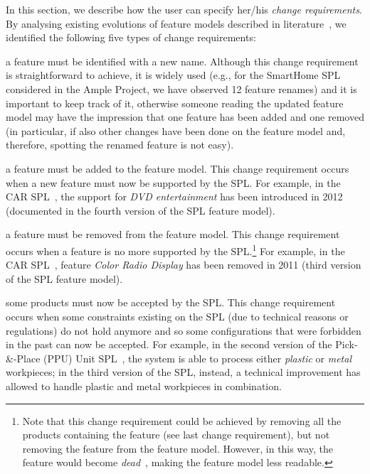 \begin{tikzborder}{\cite{Gargantini16:validation}}
\begin{tikzborder}{\cite{gargantini_combinatorial_2017}}
\begin{tikzborder}{\cite{gargantini_combinatorial_2017}}
\begin{tikzborder}{\cite{garn2019}}
\begin{tikzborder}{\cite{arcaini2019achieving}}
	In this section, we describe how the user can specify her/his {\it change requirements}.
	By analysing existing evolutions of feature models described in literature~\cite{Pleuss2012,Burdek2016,smartHomePaper,helpSystemPaper,multimediaPaper}, we identified the following five types of change requirements: 
	\begin{compactitem}
		\item a feature must be identified with a new name. Although this change requirement is straightforward to achieve, it is widely used (e.g., for the Smart\-Home SPL~\cite{smartHomePaper} considered in the Ample Project, we have observed 12 feature renames) and it is important to keep track of it, otherwise someone reading the updated feature model may have the impression that one feature has been added and one removed (in particular, if also other changes have been done on the feature model and, therefore, spotting the renamed feature is not easy).
		\item a feature must be added to the feature model. This change requirement occurs when a new feature must now be supported by the SPL. For example, in the CAR SPL~\cite{Pleuss2012}, the support for {\it DVD entertainment} has been introduced in 2012 (documented in the fourth version of the SPL feature model).
		\item a feature must be removed from the feature model. This change requirement occurs when a feature is no more supported by the SPL.\footnote{Note that this change requirement could be achieved by removing all the products containing the feature (see last change requirement), but not removing the feature from the feature model. However, in this way, the feature would become {\it dead}~\cite{benavides2010automated}, making the feature model less readable.} For example, in the CAR SPL~\cite{Pleuss2012}, feature {\it Color Radio Display} has been removed in 2011 (third version of the SPL feature model).
		\item some products must now be accepted by the SPL. This change requirement occurs when some constraints existing on the SPL (due to technical reasons or regulations) do not hold anymore and so some configurations that were forbidden in the past can now be accepted. For example, in the second version of the Pick-\&-Place (PPU) Unit SPL~\cite{Burdek2016}, the system is able to process either {\it plastic} or {\it metal} workpieces; in the third version of the SPL, instead, a technical improvement has allowed to handle plastic and metal workpieces in combination.

\end{compactitem}
\end{tikzborder}
\end{tikzborder}
\end{tikzborder}
\end{tikzborder}
\end{tikzborder}
